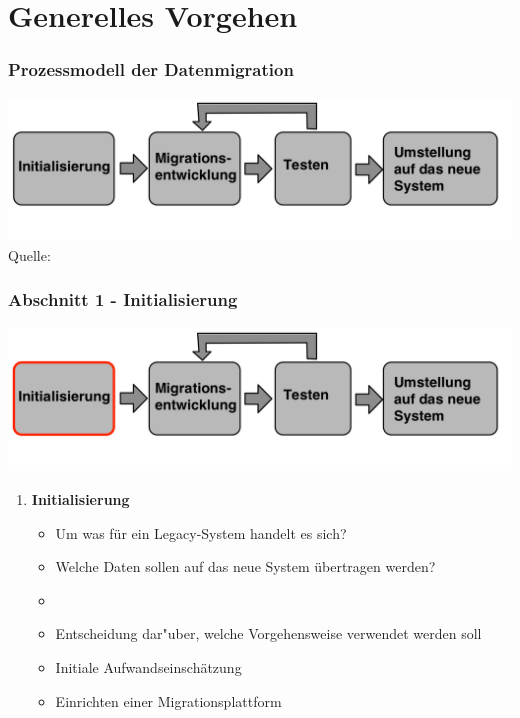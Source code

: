 \documentclass{beamer}
\begin{document}
	\section{Generelles Vorgehen}
	
	\begin{frame}
		\frametitle{Prozessmodell der Datenmigration}
		
		\centering
		\includegraphics[width=\textwidth]{../images/prozessmodellt.png}\\
		\tiny Quelle: \cite{klausMatthesSchulz-2012}
		
		
	\end{frame}
	
	\begin{frame}
		\frametitle{Abschnitt 1 - Initialisierung}
		
		\centering
		\includegraphics[width=\textwidth]{../images/prozessmodell1t.png}\\
	
		
		\begin{enumerate}
			\item \textbf{Initialisierung}
			\begin{itemize}
				\item Um was für ein Legacy-System handelt es sich?
				\item Welche Daten sollen auf das neue System übertragen werden?
				\item[]
				\item Entscheidung dar"uber, welche Vorgehensweise verwendet werden soll
				\item Initiale Aufwandseinschätzung
				\item Einrichten einer Migrationsplattform
			\end{itemize}
		\end{enumerate}
	\end{frame}
	
\end{document}
